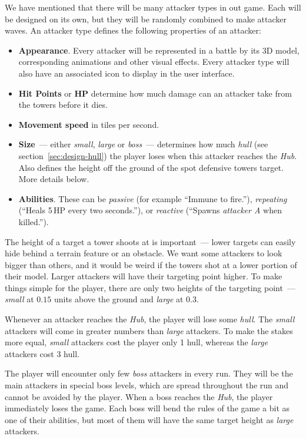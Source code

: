 We have mentioned that there will be many attacker types in out game.
Each will be designed on its own, but they will be randomly combined to make attacker waves.
An attacker type defines the following properties of an attacker:
\begin{itemize}
    \item \textbf{Appearance}. Every attacker will be represented in a battle by its 3D model, corresponding animations and other visual effects. Every attacker type will also have an associated icon to display in the user interface.
    \item \textbf{Hit Points} or \textbf{HP} determine how much damage can an attacker take from the towers before it dies.
    \item \textbf{Movement speed} in tiles per second.
    \item \textbf{Size}~--- either \emph{small}, \emph{large} or \emph{boss}~--- determines how much \emph{hull} (see section~\ref{sec:design-hull}) the player loses when this attacker reaches the \emph{Hub}. Also defines the height off the ground of the spot defensive towers target. More details below.
    \item \textbf{Abilities}. These can be \emph{passive} (for example \enquote{Immune to fire.}), \emph{repeating} (\enquote{Heals 5\,HP every two seconds.}), or \emph{reactive} (\enquote{Spawns \emph{attacker A} when killed.}).
\end{itemize}

The height of a target a tower shoots at is important~--- lower targets can easily hide behind a terrain feature or an obstacle.
We want some attackers to look bigger than others, and it would be weird if the towers shot at a lower portion of their model.
Larger attackers will have their targeting point higher.
To make things simple for the player, there are only two heights of the targeting point~--- \emph{small} at $0.15$ units above the ground and \emph{large} at $0.3$.

Whenever an attacker reaches the \emph{Hub}, the player will lose some \emph{hull}.
The \emph{small} attackers will come in greater numbers than \emph{large} attackers.
To make the stakes more equal, \emph{small} attackers cost the player only 1 hull, whereas the \emph{large} attackers cost 3 hull.

\begin{notindemo}
    The player will encounter only few \emph{boss} attackers in every run.
    They will be the main attackers in special boss levels, which are spread throughout the run and cannot be avoided by the player.
    When a boss reaches the \emph{Hub}, the player immediately loses the game.
    Each boss will bend the rules of the game a bit as one of their abilities, but most of them will have the same target height as \emph{large} attackers.
\end{notindemo}

